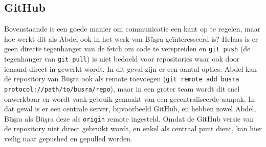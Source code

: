 \subsection{GitHub}
Bovenstaande is een goede manier om communicatie een kant op te regelen, maar hoe werkt dit als Abdel ook in het werk van B\"u\c sra ge\"interesseerd is? Helaas is er geen directe tegenhanger van de fetch om code te verspreiden en \texttt{git push} (de tegenhanger van \texttt{git pull}) is niet bedoeld voor repositories waar ook door iemand direct in gewerkt wordt. In dit geval zijn er een aantal opties: Abdel kan de repository van B\"u\c sra ook als remote toevoegen (\texttt{git remote add busra protocol://path/to/busra/repo}), maar in een groter team wordt dit snel onwerkbaar en wordt vaak gebruik gemaakt van een gecentraliseerde aanpak. In dat geval is er een centrale server, bijvoorbeeld GitHub, en hebben zowel Abdel, B\"u\c sra als B\"u\c sra deze als \texttt{origin} remote ingesteld. Omdat de GitHub versie van de repository niet direct gebruikt wordt, en enkel als centraal punt dient, kan hier veilig naar gepushed en gepulled worden.

